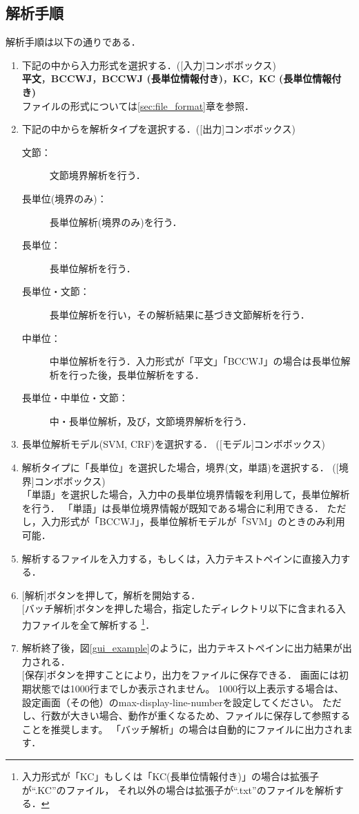 \documentclass[titlepage]{jarticle}
\begin{document}
\subsection{解析手順}
解析手順は以下の通りである．
\begin{enumerate}
\item 下記の中から入力形式を選択する．([入力]コンボボックス)　\\
\textbf{平文}，\textbf{BCCWJ}，\textbf{BCCWJ (長単位情報付き)}，\textbf{KC}，\textbf{KC (長単位情報付き)}\\
ファイルの形式については\ref{sec:file_format}章を参照．
\item 下記の中からを解析タイプを選択する．([出力]コンボボックス)
\begin{description}
\item[文節：] 文節境界解析を行う．
\item[長単位(境界のみ)：] 長単位解析(境界のみ)を行う．
\item[長単位：] 長単位解析を行う．
\item[長単位・文節：] 長単位解析を行い，その解析結果に基づき文節解析を行う\footnotemark[1]．
\item[中単位：] 中単位解析を行う．入力形式が「平文」「BCCWJ」の場合は長単位解析を行った後，長単位解析をする．
\item[長単位・中単位・文節：] 中・長単位解析，及び，文節境界解析を行う\footnotemark[1]．
\end{description}
\item 長単位解析モデル(SVM, CRF)を選択する． ([モデル]コンボボックス)
\item 解析タイプに「長単位」を選択した場合，境界(文，単語)を選択する． ([境界]コンボボックス) \\
「単語」を選択した場合，入力中の長単位境界情報を利用して，長単位解析を行う．
「単語」は長単位境界情報が既知である場合に利用できる．
ただし，入力形式が「BCCWJ」，長単位解析モデルが「SVM」のときのみ利用可能．
\item 解析するファイルを入力する，もしくは，入力テキストペインに直接入力する．
\item $[$解析$]$ボタンを押して，解析を開始する．\\
$[$バッチ解析$]$ボタンを押した場合，指定したディレクトリ以下に含まれる入力ファイルを全て解析する
\footnote{入力形式が「KC」もしくは「KC(長単位情報付き)」の場合は拡張子が``.KC''のファイル，
それ以外の場合は拡張子が``.txt''のファイルを解析する．}．

\item 解析終了後，図\ref{gui_example}のように，出力テキストペインに出力結果が出力される．\\
$[$保存$]$ボタンを押すことにより，出力をファイルに保存できる．
画面には初期状態では1000行までしか表示されません。
1000行以上表示する場合は、設定画面（その他）のmax-display-line-numberを設定してください。
ただし、行数が大きい場合、動作が重くなるため、ファイルに保存して参照することを推奨します。
「バッチ解析」の場合は自動的にファイルに出力されます．
\end{enumerate}
\end{document}
